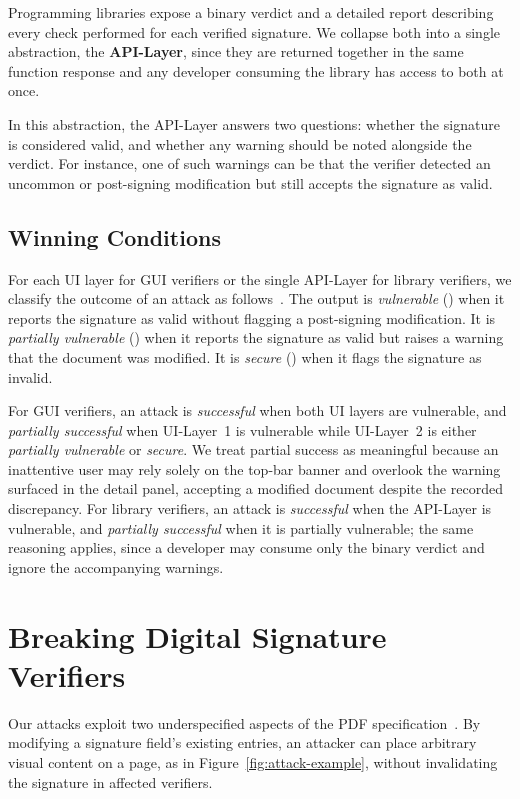 \documentclass[12pt]{article}
\begin{document}
Programming libraries expose a binary verdict and a detailed report describing every check performed for each verified signature. We collapse both into a single abstraction, the \textbf{API-Layer}, since they are returned together in the same function response and any developer consuming the library has access to both at once.

In this abstraction, the API-Layer answers two questions: whether the signature is considered valid, and whether any warning should be noted alongside the verdict. For instance, one of such warnings can be that the verifier detected an uncommon or post-signing modification but still accepts the signature as valid.

\subsection{Winning Conditions} \label{sec:winning-conditions}

For each UI layer for GUI verifiers or the single API-Layer for library verifiers, we classify the outcome of an attack as follows~\cite{one-trillion-dollar-refund}. The output is \emph{vulnerable} (\CIRCLE) when it reports the signature as valid without flagging a post-signing modification. It is \emph{partially vulnerable} (\LEFTcircle) when it reports the signature as valid but raises a warning that the document was modified. It is \emph{secure} (\Circle) when it flags the signature as invalid.

For GUI verifiers, an attack is \emph{successful} when both UI layers are vulnerable, and \emph{partially successful} when UI-Layer~1 is vulnerable while UI-Layer~2 is either \emph{partially vulnerable} or \emph{secure}. We treat partial success as meaningful because an inattentive user may rely solely on the top-bar banner and overlook the warning surfaced in the detail panel, accepting a modified document despite the recorded discrepancy. For library verifiers, an attack is \emph{successful} when the API-Layer is vulnerable, and \emph{partially successful} when it is partially vulnerable; the same reasoning applies, since a developer may consume only the binary verdict and ignore the accompanying warnings.


\section{Breaking Digital Signature Verifiers} \label{sec:attack-definitions}

Our attacks exploit two underspecified aspects of the PDF specification~\cite{iso32000-2}. By modifying a signature field's existing entries, an attacker can place arbitrary visual content on a page, as in Figure~\ref{fig:attack-example}, without invalidating the signature in affected verifiers.
\end{document}
